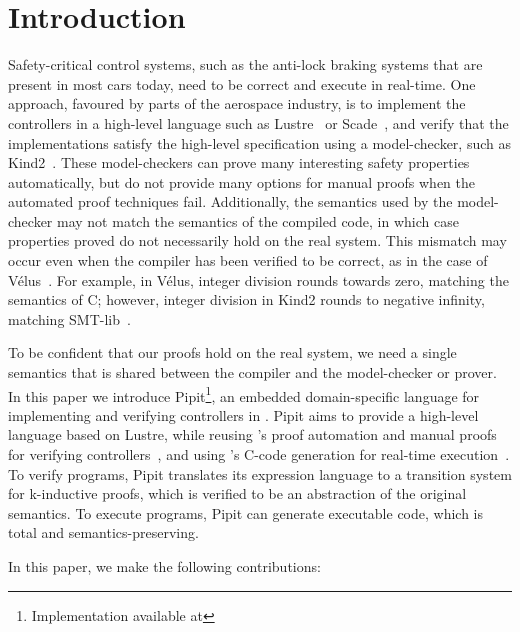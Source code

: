 \section{Introduction}
Safety-critical control systems, such as the anti-lock braking systems that are present in most cars today, need to be correct and execute in real-time.
One approach, favoured by parts of the aerospace industry, is to implement the controllers in a high-level language such as Lustre~\cite{caspi1995functional} or Scade~\cite{colaco2017scade}, and verify that the implementations satisfy the high-level specification using a model-checker, such as Kind2~\cite{champion2016kind2}.
These model-checkers can prove many interesting safety properties automatically, but do not provide many options for manual proofs when the automated proof techniques fail.
Additionally, the semantics used by the model-checker may not match the semantics of the compiled code, in which case properties proved do not necessarily hold on the real system.
This mismatch may occur even when the compiler has been verified to be correct, as in the case of Vélus~\cite{bourke2017formally}.
For example, in Vélus, integer division rounds towards zero, matching the semantics of C; however, integer division in Kind2 rounds to negative infinity, matching SMT-lib~\cite{BarFT2016SMTLIB,kind2023intdiv}.

To be confident that our proofs hold on the real system, we need a single semantics that is shared between the compiler and the model-checker or prover.
In this paper we introduce Pipit\footnote{Implementation available at \GITHUBURL}, an embedded domain-specific language for implementing and verifying controllers in \fstar{}.
Pipit aims to provide a high-level language based on Lustre, while reusing \fstar{}'s proof automation and manual proofs for verifying controllers~\cite{martinez2019meta}, and using \lowstar{}'s C-code generation for real-time execution~\cite{protzenko2017verified}.
To verify programs, Pipit translates its expression language to a transition system for k-inductive proofs, which is verified to be an abstraction of the original semantics.
To execute programs, Pipit can generate executable code, which is total and semantics-preserving.



In this paper, we make the following contributions:

